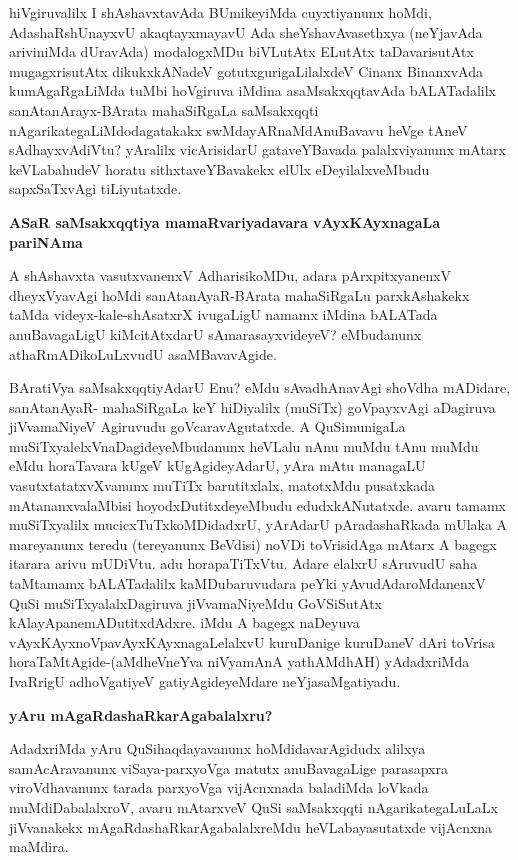 \noindent
hiVgiruvalilx I shAshavxtavAda BUmikeyiMda cuyxtiyanunx hoMdi, AdashaR\-shUnayxvU akaqtayxmayavU Ada sheYshavAvasethxya (neYjavAda ariviniMda dUravAda) moda\-logxMDu biVLutAtx ELutAtx taDavari\-sutAtx mugagxrisutAtx dikukxkANadeV gotutx\-guri\-gaLilalxdeV Cinanx BinanxvAda kumAgaRgaLiMda tuMbi hoVgiruva iMdina asaMsakxqqta\-vAda bALATadalilx sanAtanArayx-BArata mahaSiRgaLa saMsakxqqti nAgarikategaLiMdodaga\-takakx swMdayARnaMdAnuBavavu heVge tAneV sAdhayxvAdiVtu? yAralilx vicArisi\-darU gataveYBavada palalxviyanunx mAtarx keVLabahudeV horatu sithxtaveYBavakekx elUlx eDeyilalxveMbudu sapxSaTxvAgi tiLiyu\-tatxde.

\newpage

{\medskip
\noindent
{\large\bf ASaR saMsakxqqtiya mamaRvariyadavara vAyxKAyxnagaLa pariNAma}}
\medskip

\noindent
A shAshavxta vasutxvanenxV AdharisikoMDu, adara pArxpitxyanenxV dheyxVyavAgi hoMdi sanAtanAyaR-\-BArata mahaSiRgaLu parxkAshakekx taMda videyx-kale-shAsatxrX ivugaLigU namamx iMdina bALATada anuBava\-gaLigU kiMci\-tAtxdarU sAmarasayxvideyeV? eMbudanunx athaRmADikoLuLxvudU asaMBavavAgide.

BAratiVya saMsakxqqtiyAdarU Enu? eMdu sAvadhAnavAgi shoVdha mADi\-dare, sanAtanAyaR-\- mahaSiRgaLa keY hiDiyalilx (muSiTx) goVpayxvAgi aDagiruva jiVvamaNiyeV Agiruvudu goVcara\-vAgu\-tatxde. A QuSimunigaLa muSiTx\-yalelxV\-naDagideyeMbudanunx heVLalu nAnu muMdu tAnu muMdu eMdu horaTavara kUgeV kUgAgideyAdarU, yAra mAtu managaLU vasutxtatatxvXvanunx muTiTx baru\-titxlalx, matotxMdu pusatxkada mAtananxvalaMbisi hoyodxDutitxdeyeMbudu edudx\break kANutatxde. avaru tamamx muSiTxyalilx mucicxTuTxkoMDidadxrU, yArAdarU pAra\-dashaRkada mUlaka A mareyanunx teredu (tere\-yanunx BeVdisi) noVDi toVrisidAga mAtarx A bagegx itarara arivu mUDiVtu. adu hora\-paTiTxVtu. Adare elalxrU sAru\-vudU saha taMtamamx bALATadalilx kaMDubaruvudara peYki yAvu\-dAda\break\-roMdanenxV QuSi muSiTxyalalxDagiruva jiVvamaNiyeMdu GoVSiSutAtx kAla\break yApane\-mADu\-titxdAdxre. iMdu A bagegx naDeyuva vAyxKAyxnoVpavAyxKAyxna\-gaLelalxvU kuruDanige kuruDaneV dAri toVrisa horaTaMtA\-gide-(aMdheVneYva niVyamAnA yathAMdhAH\label{24}) yAdadxriMda IvaRrigU adhoVgatiyeV gati\-yAgide\-yeMdare neYjasaMgatiyadu.

{\medskip
\noindent
{\large\bf yAru mAgaRdashaRkarAgabalalxru?}}
\medskip

\noindent
 AdadxriMda yAru QuSihaqdayavanunx hoMdidavarAgidudx alilxya samAcAra\-vanunx viSaya-parx\-yoVga matutx anuBavagaLige parasapxra viroVdhavanunx tarada parxyoVga vijAcnxnada baladiMda loVkada muMdiDa\-balalxroV, avaru mAtarxveV QuSi saMsakxqqti nAgarikategaLuLaLx jiVvanakekx mAgaRdashaRka\-rAga\-balalx\-reMdu heVLa\-bayasutatxde vijAcnxna maMdira.

